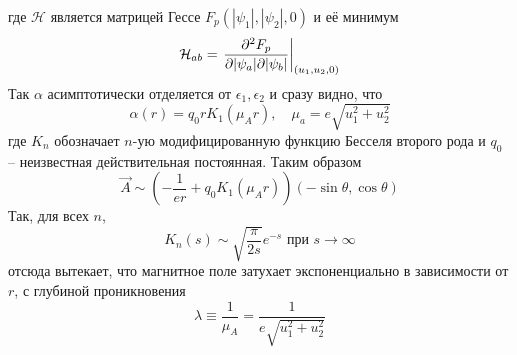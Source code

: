 где \( \mathcal{H} \) является матрицей Гессе \( F_p(|\psi_1|, |\psi_2|, 0) \) 
и её минимум
\begin{equation}
    \mathcal{H}_{ab} = \left. \frac{\partial^2 F_p}{\partial |\psi_a| \partial |\psi_b|} 
        \right|_{(u_1, u_2, 0)}
    \label{eq:12}
\end{equation}
Так \( \alpha \) асимптотически отделяется от \( \epsilon_1, \epsilon_2\) и 
сразу видно, что
\begin{equation}
    \alpha(r) = q_0 r K_1(\mu_A r), \quad
    \mu_a = e\sqrt{u_1^2 + u_2^2}
    \label{eq:13}
\end{equation}
где \( K_n \) обозначает \( n \)-ую модифицированную функцию Бесселя второго 
рода и \( q_0 \) -- неизвестная действительная постоянная. Таким образом
\begin{equation}
    \vec{A} \sim \left( -\frac{1}{er} + q_0 K_1(\mu_A r) \right)
        (-\sin\theta, \cos\theta)
    \label{eq:14}
\end{equation}
Так, для всех \( n \), 
\begin{equation}
    K_n(s) \sim \sqrt{\frac{\pi}{2s}}e^{-s} \text{ при } s \rightarrow \infty
    \label{eq:15}
\end{equation}
отсюда вытекает, что магнитное поле затухает экспоненциально в зависимости от 
\( r \), с глубиной проникновения
\begin{equation}
    \lambda \equiv \frac{1}{\mu_A} = \frac{1}{e\sqrt{u_1^2 + u_2^2}}
    \label{eq:16}
\end{equation}

